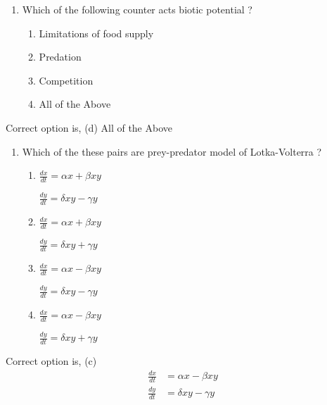 \documentclass[12pt,a4paper]{article}
\begin{document}
    \pagebreak

    \vspace*{0.5cm}

    \begin{enumerate}[label=6.]
        \item Which of the following counter acts biotic potential ?
        \begin{enumerate}
            \item Limitations of food supply
            \item Predation
            \item Competition
            \item All of the Above
        \end{enumerate}
    \end{enumerate}

    Correct option is, (d) All of the Above

    \vspace*{0.5cm}

    \begin{enumerate}[label=7.]
        \item Which of the these pairs are prey-predator model of Lotka-Volterra ?
        \begin{enumerate}
            \item $\frac{dx}{dt} = \alpha x + \beta xy$
            

            $\frac{dy}{dt} = \delta xy - \gamma y$
            \item $\frac{dx}{dt} = \alpha x + \beta xy$
            

            $\frac{dy}{dt} = \delta xy + \gamma y$
            \item $\frac{dx}{dt} = \alpha x - \beta xy$
            

            $\frac{dy}{dt} = \delta xy - \gamma y$
            \item $\frac{dx}{dt} = \alpha x - \beta xy$
            

            $\frac{dy}{dt} = \delta xy + \gamma y$
        \end{enumerate}
    \end{enumerate}

    Correct option is, (c) \begin{equation*}
        \begin{split}
            \frac{dx}{dt} & = \alpha x - \beta xy\\
            \frac{dy}{dt} & = \delta xy - \gamma y
        \end{split}
    \end{equation*}
\end{document}
